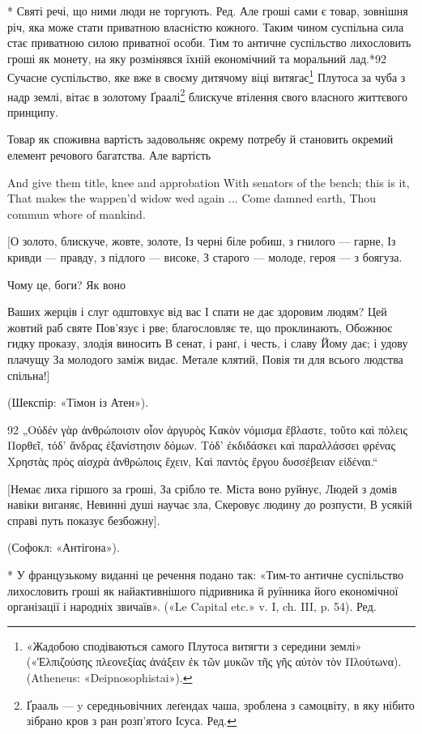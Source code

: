 * Святі речі, що ними люди не торгують. Ред.
Але гроші сами є товар, зовнішня річ, яка може стати приватною
власністю кожного. Таким чином суспільна сила стає приватною
силою приватної особи. Тим то античне суспільство лихословить
гроші як монету, на яку розмінявся їхній економічний та моральний
лад.*92 Сучасне суспільство, яке вже в своєму дитячому
віці витягає\footnote{
«Жадобою сподіваються самого Плутоса витягти з середини землі»
(«Ἐλπιζούσης  πλεονεξίας ἀνάξειν ἐκ τῶν μυκῶν τῆς γῆς αὐτὸν τὸν Πλούτωνα). (Atheneus:
«Deipnosophistai»).
} Плутоса за чуба з надр землі, вітає в золотому
Ґраалі\footnote*{
Ґрааль — y середньовічних леґендах чаша, зроблена з самоцвіту,
в яку нібито зібрано кров з ран розп’ятого Ісуса. Ред.
} блискуче втілення свого власного життєвого принципу.

Товар як споживна вартість задовольняє окрему потребу й
становить окремий елемент речового багатства. Але вартість

And give them title, knee and approbation
With senators of the bench; this is it,
That makes the wappen’d widow wed again
... Come damned earth,
Thou commun whore of mankind.

[О золото, блискуче, жовте, золоте,
Із черні біле робиш, з гнилого — гарне,
Із кривди — правду, з підлого — високе,
З старого — молоде, героя — з боягуза.

Чому це, боги? Як воно

Ваших жерців і слуг одштовхує від вас
І спати не дає здоровим людям?
Цей жовтий раб святе
Пов’язує і рве; благословляє те, що
проклинають,
Обожнює гидку проказу, злодія виносить
В сенат, і ранґ, і честь, і славу
Йому дає; і удову плачущу
За молодого заміж видає.
Метале клятий,
Повія ти для всього людства спільна!]

(Шекспір: «Тімон із Атен»).

92 „Οὐδέν γὰρ ἀνθρώποισιν οἷον ἀργυρὸς
Κακὸν νόμισμα ἔβλαστε, τοῦτο καὶ πόλεις
Πορθεῖ, τόδ’ ἄνδρας ἐξανίστησιν δόμων.
Τόδ’ ἐκδιδάσκει καὶ παραλλάσσει φρένας
Χρηστὰς πρὸς αἰσχρὰ ἀνθρώποις ἔχειν,
Καὶ παντὸς ἔργου δυσσέβειαν εἰδέναι.“

[Немає лиха гіршого за гроші,
За срібло те. Міста воно руйнує,
Людей з домів навіки виганяє,
Невинні душі научає зла,
Скеровує людину до розпусти,
В усякій справі путь показує безбожну].

(Софокл: «Антігона»).

* У французькому виданні це речення подано так: «Тим-то
античне
суспільство лихословить гроші як найактивнішого підривника й руїнника
його економічної організації і народніх звичаїв». («Le Capital etc.» v. I,
ch. III, p. 54). Ред.
\parbreak{}  %
